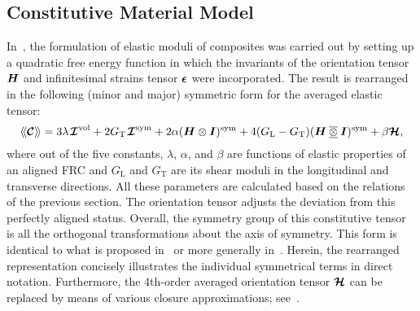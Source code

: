 \subsection{Constitutive Material Model}	
	In~\autocite{Spencer.1984}, the formulation of elastic moduli of composites was carried out by setting up a quadratic free energy function in which the invariants of the orientation tensor $\tenb{H}$ and infinitesimal strains tensor $\tenb{\epsilon}$ were incorporated. The result is rearranged in the following (minor and major) symmetric form for the averaged elastic tensor:
	\begin{equation}\label{eq:C}
	\averot{\tend{C}} = 3\lambda\unitd^\vol+2G_\text{T}\unitd^\sym +2\alpha (\tenb{H}\dyad\unitb)^\sym+4(G_\text{L}-G_\text{T})(\tenb{H}\dyadd\unitb)^\sym +\beta\tend{H},
	\end{equation}
	where out of the five constants, $\lambda$, $\alpha$, and $\beta$ are functions of elastic properties of an aligned FRC and $G_\text{L}$ and $G_\text{T}$ are its shear moduli in the longitudinal and transverse directions. All these parameters are calculated based on the relations of the previous section. The orientation tensor adjusts the deviation from this perfectly aligned status. Overall, the symmetry group of this constitutive tensor is all the orthogonal transformations about the axis of symmetry. This form is identical to what is proposed in~\autocite{Advani.1987} or more generally in~\autocite{Cowin.1985}. Herein, the rearranged representation concisely illustrates the individual symmetrical terms in direct notation. Furthermore, the 4th-order averaged orientation tensor $\mathord{\mbox{\boldmath$\mathcal{H}$}}$ can be replaced by means of various closure approximations; see~\autocite{Breuer.2019,Advani.1990}.%

